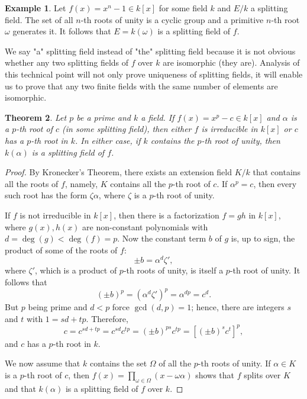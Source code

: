 \documentclass[12pt]{report}
\newtheorem{thm}{Theorem}[section]
\theoremstyle{definition}
\newtheorem{example}[thm]{Example}
\def\aa{\alpha}
\begin{document}
\begin{example}
    Let $f(x)=x^n-1 \in k[x]$ for some field $k$ and $E/k$ a splitting field. The set of all $n$-th roots of unity is a cyclic group and a primitive $n$-th root $\omega$ generates it. It follows that $E=k(\omega)$ is a splitting field of $f$. 
\end{example}

We say "a" splitting field instead of "the" splitting field because it is not obvious whether any two splitting fields of $f$ over $k$ are isomorphic (they are). Analysis of this technical point will not only prove uniqueness of splitting fields, it will enable us to prove that any two finite fields with the same number of elements are isomorphic.

\begin{thm}\label{kummer1}
    Let $p$ be a prime and $k$ a field. If $f(x)=x^p-c\in k[x]$ and $\aa$ is a $p$-th root of $c$ (in some splitting field), then either $f$ is irreducible in $k[x]$ or $c$ has a $p$-th root in $k$. In either case, if $k$ contains the $p$-th root of unity, then $k(\aa)$ is a splitting field of $f$.
\end{thm}

\begin{proof}
    By Kronecker's Theorem, there exists an extension field $K/k$ that contains all the roots of $f$, namely, $K$ contains all the $p$-th root of $c$. If $\aa^p=c$, then every such root has the form $\zeta\aa$, where $\zeta$ is a $p$-th root of unity.

    If $f$ is not irreducible in $k[x]$, then there is a factorization $f = gh$ in $k[x]$, where $g(x), h(x)$ are non-constant polynomials with $d = \deg(g) < \deg(f) = p$. Now the constant term $b$ of $g$ is, up to sign, the product of some of the roots of $f$: $$\pm b = \aa^d\zeta',$$ where $\zeta'$, which is a product of $p$-th roots of unity, is itself a $p$-th root of unity. It follows that $$(\pm b)^p = (\aa^d\zeta')^p = \aa^{dp} = c^d.$$
    But $p$ being prime and $d < p$ force $\gcd(d, p) = 1$; hence, there are integers $s$ and $t$ with $1 = sd + tp$. Therefore, $$c = c^{sd+tp} = c^{sd}c^{tp} = (\pm b)^{ps}c^{tp} = [(\pm b)^sc^t]^p,$$ and $c$ has a $p$-th root in $k$.

    We now assume that $k$ contains the set $\Omega$ of all the $p$-th roots of unity. If $\aa  \in  K$ is a $p$-th root of $c$, then $f(x) =\prod_{\omega\in \Omega}(x- \omega\aa )$ shows that $f$ splits over $K$ and that $k(\aa)$ is a splitting field of $f$ over $k$. 
\end{proof}
\end{document}

